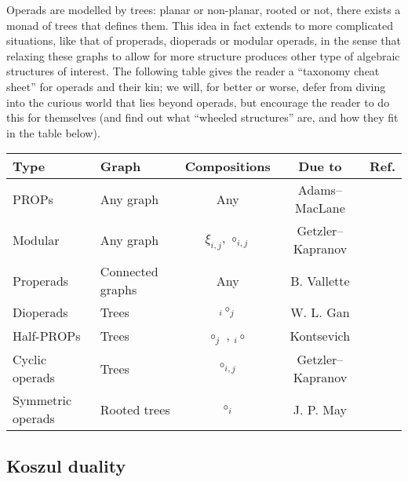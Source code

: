 Operads are modelled by trees: planar or
non-planar, rooted or not, there exists a monad
of trees that defines them. This idea
 in fact extends
to more complicated situations, like that of
properads, dioperads or modular operads,
in the sense that relaxing these
graphs to allow for more structure 
produces other type of algebraic structures
of interest. The following table
gives the reader a ``taxonomy cheat sheet''
for operads and their kin; we will, for better
or worse, defer from diving into the curious
world that lies beyond operads, but encourage
the reader to do this for themselves (and find
out what ``wheeled structures'' are, and how
they fit in the table below).

\begin{center}
\begin{tabular}{@{}llccr@{}} \toprule
Type & Graph & Compositions & Due to & Ref.\\ \midrule
PROPs & Any graph & Any  & Adams--MacLane \\
Modular & Any graph & $\xi_{i,j}$, $\circ_{i,j}$  & Getzler--Kapranov & \cite{Getzler1998}\\ 
Properads & Connected graphs & Any & B. Vallette & \cite{Vallette2004}\\
Dioperads & Trees & ${}_i\circ_j$ & W. L. Gan & \cite{Gan2003}\\
Half-PROPs & Trees & $\circ_j$ , ${}_i\circ$ & 
 Kontsevich\footnotemark & \cite{Markl2007}\\ 
Cyclic operads & Trees &  $\circ_{i,j}$ & Getzler--Kapranov & \cite{Kajiura2008}\\ 
Symmetric operads & Rooted trees & $\circ_i$  & J. P. May & \cite{May1972}\\ 
\bottomrule
\end{tabular}
\end{center}
\subsection{Koszul duality}
 
